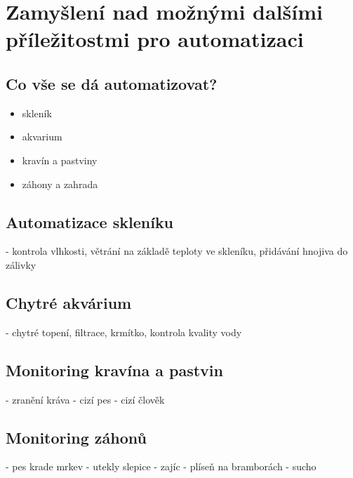 \chapter{Zamyšlení nad možnými dalšími příležitostmi pro automatizaci}

\section{Co vše se dá automatizovat?}
\begin{itemize}
    \item skleník
    \item akvarium
    \item kravín a pastviny
    \item záhony a zahrada
\end{itemize}

\section{Automatizace skleníku}
- kontrola vlhkosti, větrání na základě teploty ve skleníku, přidávání hnojiva do zálivky

\section{Chytré akvárium}
- chytré topení, filtrace, krmítko, kontrola kvality vody

\section{Monitoring kravína a pastvin}
- zranění kráva\newline
- cizí pes\newline
- cizí člověk

\section{Monitoring záhonů}
- pes krade mrkev\newline
- utekly slepice\newline
- zajíc\newline
- plíseň na bramborách\newline
- sucho